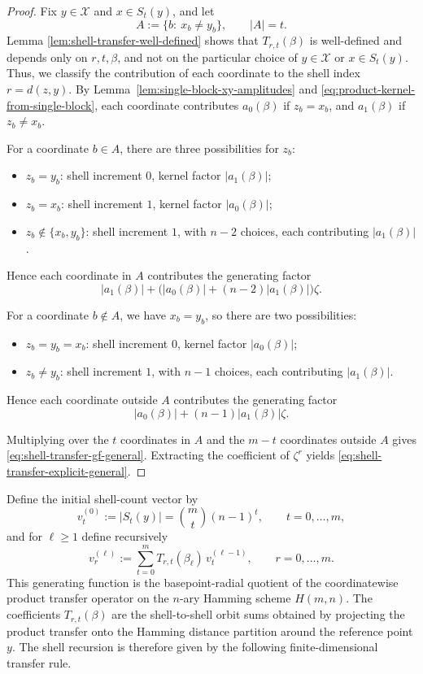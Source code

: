 \documentclass[a4paper,onecolumn,11pt,unpublished]{quantumarticle}
\theoremstyle{remark}
\begin{document}
\begin{proof}
Fix \(y\in \mathcal X\) and \(x\in S_t(y)\), and let
\[
A:=\{b:\ x_b\neq y_b\},
\qquad |A|=t.
\]
Lemma \ref{lem:shell-transfer-well-defined} shows that $T_{r,t}(\beta)$ is well-defined and depends only on \(r,t,\beta\), and not on the
particular choice of \(y\in \mathcal X\) or \(x\in S_t(y)\). Thus, we classify the contribution of each coordinate to the shell index
\(r=d(z,y)\). By Lemma~\ref{lem:single-block-xy-amplitudes} and \cref{eq:product-kernel-from-single-block}, each coordinate contributes
\(a_0(\beta)\) if \(z_b=x_b\), and \(a_1(\beta)\) if \(z_b\neq x_b\).

For a coordinate \(b\in A\), there are three possibilities for \(z_b\):
\begin{itemize}
\item \(z_b=y_b\): shell increment \(0\),   kernel factor
      \(|a_1(\beta)|\);
\item \(z_b=x_b\): shell increment \(1\),   kernel factor
      \(|a_0(\beta)|\);
\item \(z_b\notin\{x_b,y_b\}\): shell increment \(1\), with \(n-2\) choices,
      each contributing \(|a_1(\beta)|\).
\end{itemize}
Hence each coordinate in \(A\) contributes the generating factor
\[
|a_1(\beta)|
+
\bigl(|a_0(\beta)|+(n-2)|a_1(\beta)|\bigr)\zeta.
\]

For a coordinate \(b\notin A\), we have \(x_b=y_b\), so there are two
possibilities:
\begin{itemize}
\item \(z_b=y_b=x_b\): shell increment \(0\),   kernel factor
      \(|a_0(\beta)|\);
\item \(z_b\neq y_b\): shell increment \(1\), with \(n-1\) choices, each
      contributing \(|a_1(\beta)|\).
\end{itemize}
Hence each coordinate outside \(A\) contributes the generating factor
\[
|a_0(\beta)|+(n-1)|a_1(\beta)|\zeta.
\]

Multiplying over the \(t\) coordinates in \(A\) and the \(m-t\) coordinates
outside \(A\) gives \eqref{eq:shell-transfer-gf-general}. Extracting the
coefficient of \(\zeta^r\) yields
\eqref{eq:shell-transfer-explicit-general}.
\end{proof}

Define the initial shell-count vector by
\begin{equation}
\label{eq:v0-def-general}
v_t^{(0)}
:=
|S_t(y)|
=
\binom{m}{t}(n-1)^t,
\qquad t=0,\dots,m,
\end{equation}
and for \(\ell\ge 1\) define recursively
\begin{equation}
\label{eq:vp-recursion-general}
v_r^{(\ell)}
:=
\sum_{t=0}^{m}T_{r,t}(\beta_\ell)\,v_t^{(\ell-1)},
\qquad r=0,\dots,m.
\end{equation}
\noindent
This generating function is the basepoint-radial quotient of the coordinatewise product transfer operator on the \(n\)-ary Hamming scheme \(H(m,n)\). The coefficients \(T_{r,t}(\beta)\) are the shell-to-shell orbit sums obtained by projecting the product transfer onto the Hamming distance partition around the reference point \(y\). The shell recursion is therefore given by the following
finite-dimensional transfer rule.
\end{document}
